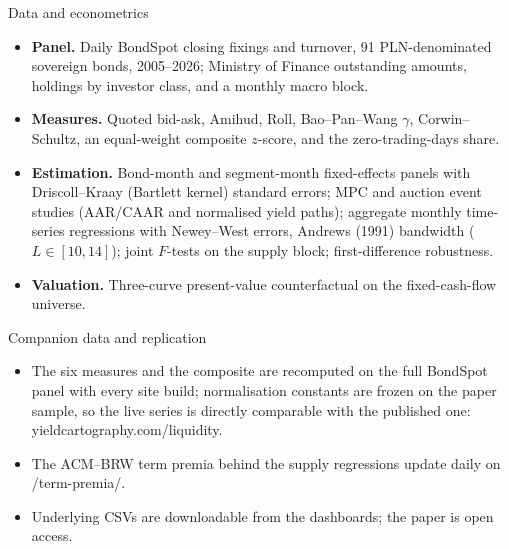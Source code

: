 \documentclass[aspectratio=169,11pt]{beamer}
\begin{document}
\begin{frame}{Data and econometrics}
  \small
  \begin{itemize}
    \item \textbf{Panel.} Daily BondSpot closing fixings and turnover, 91
          PLN-denominated sovereign bonds, 2005--2026; Ministry of Finance
          outstanding amounts, holdings by investor class, and a monthly macro
          block.
    \item \textbf{Measures.} Quoted bid-ask, Amihud, Roll, Bao--Pan--Wang
          $\gamma$, Corwin--Schultz, an equal-weight composite $z$-score, and
          the zero-trading-days share.
    \item \textbf{Estimation.} Bond-month and segment-month fixed-effects
          panels with Driscoll--Kraay (Bartlett kernel) standard errors;
          MPC and auction event studies (AAR/CAAR and normalised yield paths);
          aggregate monthly time-series regressions with Newey--West errors,
          Andrews (1991) bandwidth ($L \in [10,14]$); joint $F$-tests on the
          supply block; first-difference robustness.
    \item \textbf{Valuation.} Three-curve present-value counterfactual on the
          fixed-cash-flow universe.
  \end{itemize}
\end{frame}

\begin{frame}{Companion data and replication}
  \begin{itemize}
    \item The six measures and the composite are recomputed on the full
          BondSpot panel with every site build; normalisation constants are
          frozen on the paper sample, so the live series is directly comparable
          with the published one:
          \textcolor{ycaccent}{\ttfamily yieldcartography.com/liquidity}.
    \item The ACM--BRW term premia behind the supply regressions update daily
          on \textcolor{ycaccent}{\ttfamily /term-premia/}.
    \item Underlying CSVs are downloadable from the dashboards; the paper is
          open access.
  \end{itemize}
\end{frame}
\end{document}
